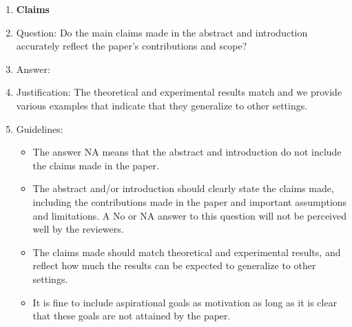 \documentclass{article} %
\newcounter{ct}
\theoremstyle{definition}
\theoremstyle{remark}
\begin{document}
%
%



\begin{enumerate}

\item {\bf Claims}
    \item[] Question: Do the main claims made in the abstract and introduction accurately reflect the paper's contributions and scope?
    \item[] Answer: \answerYes{} %
    \item[] Justification: The theoretical and experimental results match and we provide various examples that indicate that they generalize to other settings.
    \item[] Guidelines:
    \begin{itemize}
        \item The answer NA means that the abstract and introduction do not include the claims made in the paper.
        \item The abstract and/or introduction should clearly state the claims made, including the contributions made in the paper and important assumptions and limitations. A No or NA answer to this question will not be perceived well by the reviewers.
        \item The claims made should match theoretical and experimental results, and reflect how much the results can be expected to generalize to other settings.
        \item It is fine to include aspirational goals as motivation as long as it is clear that these goals are not attained by the paper.
    \end{itemize}


\end{enumerate}
\end{document}
